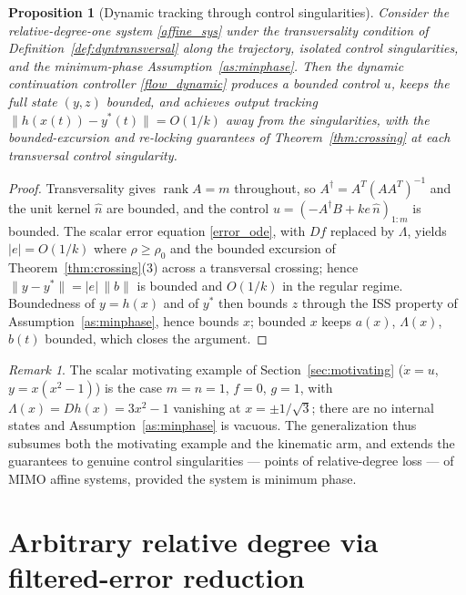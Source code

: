 \documentclass[11pt,american]{article}
\DeclareMathOperator{\rank}{\operatorname{rank}}
\newtheorem{proposition}{Proposition}
\theoremstyle{definition}
\theoremstyle{plain}
\theoremstyle{remark}
\newtheorem{remark}{Remark}
\begin{document}
\begin{proposition}[Dynamic tracking through control singularities]\label{prop:dyntracking}
Consider the relative-degree-one system \eqref{affine_sys} under the transversality condition of Definition~\ref{def:dyntransversal} along the trajectory, isolated control singularities, and the minimum-phase Assumption~\ref{as:minphase}. Then the dynamic continuation controller \eqref{flow_dynamic} produces a bounded control $u$, keeps the full state $(y,z)$ bounded, and achieves output tracking $\|h(x(t)) - y^*(t)\| = O(1/k)$ away from the singularities, with the bounded-excursion and re-locking guarantees of Theorem~\ref{thm:crossing} at each transversal control singularity.
\end{proposition}

\begin{proof}
Transversality gives $\rank A = m$ throughout, so $A^\dagger = A^T(AA^T)^{-1}$ and the unit kernel $\hat n$ are bounded, and the control $u = (-A^\dagger B + k e\,\hat n)_{1:m}$ is bounded. The scalar error equation \eqref{error_ode}, with $D f$ replaced by $\Lambda$, yields $|e| = O(1/k)$ where $\rho \ge \rho_0$ and the bounded excursion of Theorem~\ref{thm:crossing}(3) across a transversal crossing; hence $\|y - y^*\| = |e|\,\|b\|$ is bounded and $O(1/k)$ in the regular regime. Boundedness of $y = h(x)$ and of $y^*$ then bounds $z$ through the ISS property of Assumption~\ref{as:minphase}, hence bounds $x$; bounded $x$ keeps $a(x)$, $\Lambda(x)$, $b(t)$ bounded, which closes the argument.
\end{proof}

\begin{remark}
The scalar motivating example of Section~\ref{sec:motivating} ($\dot x = u$, $y = x(x^2-1)$) is the case $m = n = 1$, $f = 0$, $g = 1$, with $\Lambda(x) = D h(x) = 3x^2-1$ vanishing at $x = \pm 1/\sqrt3$; there are no internal states and Assumption~\ref{as:minphase} is vacuous. The generalization thus subsumes both the motivating example and the kinematic arm, and extends the guarantees to genuine control singularities --- points of relative-degree loss --- of MIMO affine systems, provided the system is minimum phase.
\end{remark}

\section{Arbitrary relative degree via filtered-error reduction}\label{sec:reldeg}
\end{document}
